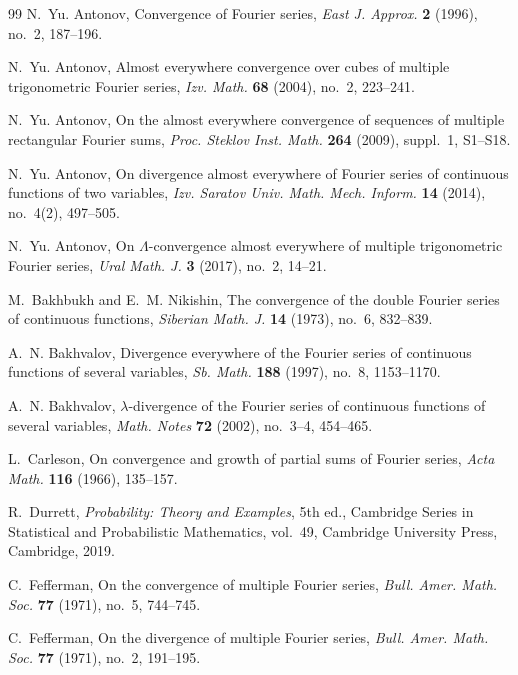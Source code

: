 \documentclass[11pt]{amsart}
\numberwithin{equation}{section}
\begin{document}
\begin{thebibliography}{99}
 N.~Yu. Antonov, Convergence of Fourier series, \emph{%
East J. Approx.} \textbf{2} (1996), no.~2, 187--196.

 N.~Yu. Antonov, Almost everywhere convergence over
cubes of multiple trigonometric Fourier series, \emph{Izv. Math.} \textbf{68}
(2004), no.~2, 223--241.

 N.~Yu. Antonov, On the almost everywhere convergence
of sequences of multiple rectangular Fourier sums, \emph{Proc. Steklov Inst.
Math.} \textbf{264} (2009), suppl.~1, S1--S18.

 N.~Yu. Antonov, On divergence almost everywhere of
Fourier series of continuous functions of two variables, \emph{Izv. Saratov
Univ. Math. Mech. Inform.} \textbf{14} (2014), no.~4(2), 497--505.

 N.~Yu. Antonov, On $\Lambda$-convergence almost
everywhere of multiple trigonometric Fourier series, \emph{Ural Math. J.} 
\textbf{3} (2017), no.~2, 14--21.

 M.~Bakhbukh and E.~M. Nikishin, The
convergence of the double Fourier series of continuous functions, \emph{%
Siberian Math. J.} \textbf{14} (1973), no.~6, 832--839.

 A.~N. Bakhvalov, Divergence everywhere of the
Fourier series of continuous functions of several variables, \emph{Sb. Math.}
\textbf{188} (1997), no.~8, 1153--1170.

 A.~N. Bakhvalov, $\lambda$-divergence of the Fourier
series of continuous functions of several variables, \emph{Math. Notes} 
\textbf{72} (2002), no.~3--4, 454--465.

 L.~Carleson, On convergence and growth of partial
sums of Fourier series, \emph{Acta Math.} \textbf{116} (1966), 135--157.

 R.~Durrett, \emph{Probability: Theory and Examples},
5th ed., Cambridge Series in Statistical and Probabilistic Mathematics,
vol.~49, Cambridge University Press, Cambridge, 2019.

 C.~Fefferman, On the convergence of
multiple Fourier series, \emph{Bull. Amer. Math. Soc.} \textbf{77} (1971),
no.~5, 744--745.

 C.~Fefferman, On the divergence of
multiple Fourier series, \emph{Bull. Amer. Math. Soc.} \textbf{77} (1971),
no.~2, 191--195.


\end{thebibliography}
\end{document}
